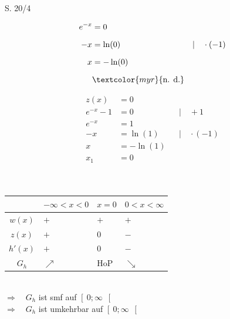 \begin{Exercise}{S. 20/4}{}
\begin{enumerate}[leftmargin=*]
{\begin{enumerate}[label=\alph*), leftmargin=*]
{\begin{itemize}[leftmargin=*]
{\begin{minipage}[t]{0.35\linewidth}
\begin{align*}
                                e^{-x} &= 0 &&\\[1.5ex]
                                -x &= \ln(0) &&| \quad \cdot (-1)\\[1.5ex]
                                x &= -\ln(0) &&\\[1.5ex]
                                & \textcolor{myr}{\text{n. d.}} &&
                            \end{align*}
                        \end{minipage}
                        \hfill
                        \begin{minipage}[t]{0.50\linewidth}
                            \begin{align*}
                                z(x) &= 0 && \\[2.0ex]
                                e^{-x} - 1 &= 0 &&| \quad + 1\\[1.5ex]
                                e^{-x} &= 1 &&\\[1.5ex]
                                -x &= \ln(1) &&| \quad \cdot (-1)\\[1.5ex]
                                x &= -\ln(1) &&\\[1.5ex]
                                x_{1} &= 0 &&\\
                            \end{align*}
                        \end{minipage}\\
                        \begin{tabularx}{0.95\linewidth}{c|X|X|X}
                            & $-\infty < x < 0$ & $x = 0$ & $0 < x < \infty$ \\ \hline
                            $w(x)$ & $+$ & $+$ & $+$ \\ \hline
                            $z(x)$ & $+$ & $0$ & $-$ \\ \hline
                            $h'(x)$ & $+$ & $0$ & $-$ \\ \hline
                            $G_{h}$ & $\nearrow$ & HoP & $\searrow$ \\              
                        \end{tabularx}\\[4.0ex]
                        $\Rightarrow \quad G_{h}$ ist smf auf $\left[ \ 0; \infty \ \right[$\\[1.0ex]
                        $\Rightarrow \quad G_{h}$ ist umkehrbar auf $\left[ \ 0; \infty \ \right[$\\[-2.0ex]
}
\end{itemize}}
\end{enumerate}}
\end{enumerate}
\end{Exercise}
